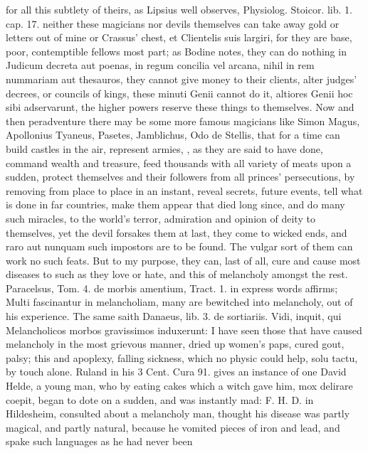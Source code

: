 {{for all this subtlety of theirs, as Lipsius well observes, Physiolog.
Stoicor. lib. 1. cap. 17. neither these magicians nor devils themselves
can take away gold or letters out of mine or Crassus' chest, et
Clientelis suis largiri, for they are base, poor, contemptible fellows
most part; as Bodine notes, they can do nothing in Judicum
decreta aut poenas, in regum concilia vel arcana, nihil in rem
nummariam aut thesauros, they cannot give money to their clients, alter
judges' decrees, or councils of kings, these minuti Genii cannot do it,
altiores Genii hoc sibi adservarunt, the higher powers reserve these
things to themselves. Now and then peradventure there may be some more
famous magicians like Simon Magus, Apollonius Tyaneus, Pasetes,
Jamblichus, Odo de Stellis, that for a time can build castles in
the air, represent armies, \etc{}, as they are said to have done,
command wealth and treasure, feed thousands with all variety of meats
upon a sudden, protect themselves and their followers from all princes'
persecutions, by removing from place to place in an instant, reveal
secrets, future events, tell what is done in far countries, make them
appear that died long since, and do many such miracles, to the world's
terror, admiration and opinion of deity to themselves, yet the devil
forsakes them at last, they come to wicked ends, and raro aut nunquam
such impostors are to be found. The vulgar sort of them can work no
such feats. But to my purpose, they can, last of all, cure and cause
most diseases to such as they love or hate, and this of
melancholy amongst the rest. Paracelsus, Tom. 4. de morbis
amentium, Tract. 1. in express words affirms; Multi fascinantur in
melancholiam, many are bewitched into melancholy, out of his
experience. The same saith Danaeus, lib. 3. de sortiariis. Vidi,
inquit, qui Melancholicos morbos gravissimos induxerunt: I have seen
those that have caused melancholy in the most grievous manner,
dried up women's paps, cured gout, palsy; this and apoplexy,
falling sickness, which no physic could help, solu tactu, by touch
alone. Ruland in his 3 Cent. Cura 91. gives an instance of one David
Helde, a young man, who by eating cakes which a witch gave him, mox
delirare coepit, began to dote on a sudden, and was instantly mad: F.
H. D. in Hildesheim, consulted about a melancholy man, thought
his disease was partly magical, and partly natural, because he vomited
pieces of iron and lead, and spake such languages as he had never been
}}
